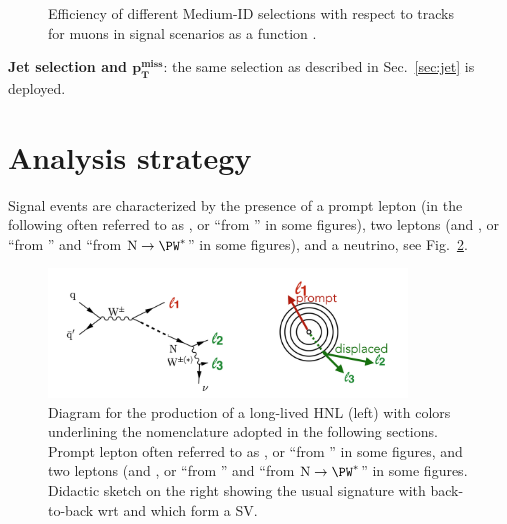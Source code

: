 \begin{figure}[h]
{}
  \caption{Efficiency of different Medium-ID selections with respect
    to tracks for \displ
    muons in signal scenarios as a function \Deltwod.}
  \label{fig:modMedium_common}
\end{figure}

\textbf{Jet selection and $\boldsymbol{p_{T}^{miss}}$}: the same selection as described in Sec.~\ref{sec:jet} is deployed.


\section{Analysis strategy}\label{sec:llanalisi}
Signal events are
characterized by the presence of a prompt lepton (in the following
often referred to as \lone, or ``\lept from \PW'' in some figures),
two \displ leptons (\ltwo and \lthree, or
``\lept from \hnl'' and ``\lept from $\hnl\to\PW^\ast$'' in some
figures), and a neutrino, see Fig.~\ref{fig:c6llsketch}.

\begin{figure}[h]
\centering
\includegraphics[width=0.85\textwidth]{Figures/c6/llsketch}
\caption{Diagram for the production of a long-lived HNL (left) with colors
  underlining the nomenclature adopted in the following
  sections. Prompt lepton often referred to as \lone, or ``\lept from
  \PW'' in some figures, and two \displ leptons (\ltwo and \lthree, or
``\lept from \hnl'' and ``\lept from $\hnl\to\PW^\ast$'' in some
figures. Didactic sketch on the right showing the usual signature with
 \lone back-to-back wrt \ltwo and \lthree which form a SV.}
\label{fig:c6llsketch}
\end{figure}

